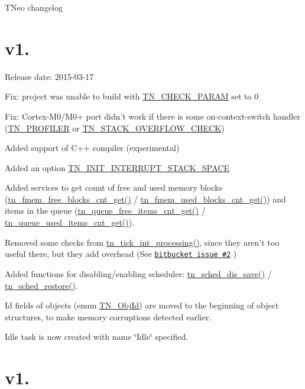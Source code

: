 T\+Neo changelog\hypertarget{changelog_changelog_v1_07}{}\section{v1.}\label{changelog_changelog_v1_07}
Release date\+: 2015-\/03-\/17


\begin{DoxyItemize}
\item Fix\+: project was unable to build with {\ttfamily \hyperlink{tn__cfg__default_8h_a1f197294df3276fec431930545acafd5}{T\+N\+\_\+\+C\+H\+E\+C\+K\+\_\+\+P\+A\+R\+A\+M}} set to 0
\item Fix\+: Cortex-\/\+M0/\+M0+ port didn't work if there is some on-\/context-\/switch handler ({\ttfamily \hyperlink{tn__cfg__default_8h_a49a546b18cc1f75b51d4cf8b290634dd}{T\+N\+\_\+\+P\+R\+O\+F\+I\+L\+E\+R}} or {\ttfamily \hyperlink{tn__cfg__default_8h_ac6a9bbac3b3b25d9b5bc8c21d2e09955}{T\+N\+\_\+\+S\+T\+A\+C\+K\+\_\+\+O\+V\+E\+R\+F\+L\+O\+W\+\_\+\+C\+H\+E\+C\+K}})
\item Added support of C++ compiler (experimental)
\item Added an option {\ttfamily \hyperlink{tn__cfg__default_8h_aab948a5a8178594322f364800e0e53ee}{T\+N\+\_\+\+I\+N\+I\+T\+\_\+\+I\+N\+T\+E\+R\+R\+U\+P\+T\+\_\+\+S\+T\+A\+C\+K\+\_\+\+S\+P\+A\+C\+E}}
\item Added services to get count of free and used memory blocks ({\ttfamily \hyperlink{tn__fmem_8h_ae8b80e0a0a8b07e11acbc4f15f3ef32d}{tn\+\_\+fmem\+\_\+free\+\_\+blocks\+\_\+cnt\+\_\+get()}} / {\ttfamily \hyperlink{tn__fmem_8h_a2f23f2cdb3e6f3f2a1c1f9ebc4e6e8cb}{tn\+\_\+fmem\+\_\+used\+\_\+blocks\+\_\+cnt\+\_\+get()}}) and items in the queue ({\ttfamily \hyperlink{tn__dqueue_8h_af541f16598e13f980ddc2482e6af6044}{tn\+\_\+queue\+\_\+free\+\_\+items\+\_\+cnt\+\_\+get()}} / {\ttfamily \hyperlink{tn__dqueue_8h_aa17fd667cab2e4a41d9e89b8cba603cd}{tn\+\_\+queue\+\_\+used\+\_\+items\+\_\+cnt\+\_\+get()}}).
\item Removed some checks from {\ttfamily \hyperlink{tn__sys_8h_aa44d297639e0520420890ef2bb7e2c1c}{tn\+\_\+tick\+\_\+int\+\_\+processing()}}, since they aren't too useful there, but they add overhead (See \href{https://bitbucket.org/dfrank/tneokernel/issue/2/system-clock-service-routine-could-be-more}{\tt bitbucket issue \#2} )
\item Added functions for disabling/enabling scheduler\+: {\ttfamily \hyperlink{tn__sys_8h_ad0763ae1aa0b44ef4143ea06539974d5}{tn\+\_\+sched\+\_\+dis\+\_\+save()}} / {\ttfamily \hyperlink{tn__sys_8h_ac67d696d2efe349c6672a2c74f30b5fc}{tn\+\_\+sched\+\_\+restore()}}.
\item Id fields of objects ({\ttfamily enum \hyperlink{tn__common_8h_ae779dd1f6735f6e139fb70acd004d976}{T\+N\+\_\+\+Obj\+Id}}) are moved to the beginning of object structures, to make memory corruptions detected earlier.
\item Idle task is now created with name \char`\"{}\+Idle\char`\"{} specified.
\end{DoxyItemize}\hypertarget{changelog_changelog_v1_06}{}\section{v1.}\label{changelog_changelog_v1_06}
